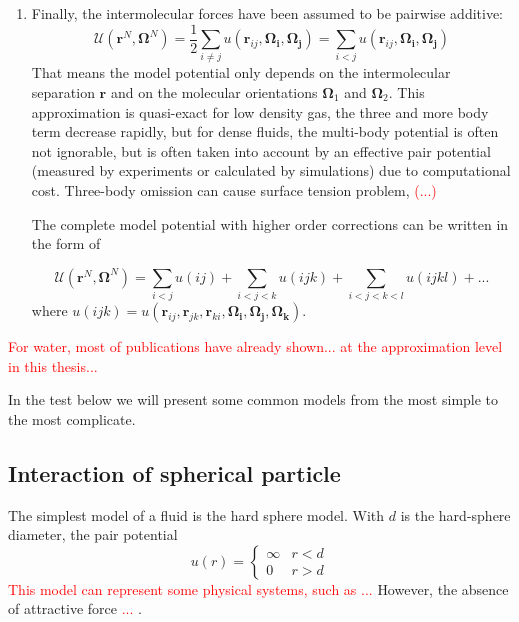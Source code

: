 \begin{enumerate}
\item Finally, the intermolecular forces have been assumed to be pairwise
additive:
\begin{equation}
\mathcal{U}(\mathbf{r}^{N},\mathbf{\Omega}^{N})=\frac{1}{2}\sum_{i\neq j}u(\mathbf{r}_{ij},\mathbf{\Omega_{i}},\mathbf{\Omega_{j}})=\sum_{i<j}u(\mathbf{r}_{ij},\mathbf{\Omega_{i}},\mathbf{\Omega_{j}})\label{eq:pair-potential}
\end{equation}
That means the model potential only depends on the intermolecular
separation $\mathbf{r}$ and on the molecular orientations $\mathbf{\Omega}_{1}$
and $\mathbf{\Omega}_{2}$. This approximation is quasi-exact for
low density gas, the three and more body term decrease rapidly, but
for dense fluids, the multi-body potential is often not ignorable,
but is often taken into account by an effective pair potential (measured
by experiments or calculated by simulations) due to computational
cost. Three-body omission can cause surface tension problem, \textcolor{red}{(...)}


The complete model potential with higher order corrections can be
written in the form of


\begin{equation}
\mathcal{U}(\mathbf{r}^{N},\mathbf{\Omega}^{N})=\sum_{i<j}u(ij)+\sum_{i<j<k}u(ijk)+\sum_{i<j<k<l}u(ijkl)+...
\end{equation}
where $u(ijk)=u(\mathbf{r}_{ij},\mathbf{r}_{jk},\mathbf{r}_{ki},\mathbf{\Omega_{i}},\mathbf{\Omega_{j}},\mathbf{\Omega_{k}})$.

\end{enumerate}
\textcolor{red}{For water, most of publications have already shown...
at the approximation level in this thesis...}

In the test below we will present some common models from the most
simple to the most complicate.


\subsection{Interaction of spherical particle}

The simplest model of a fluid is the hard sphere model. With $d$
is the hard-sphere diameter, the pair potential
\begin{equation}
u(r)=\begin{cases}
\infty & r<d\\
0 & r>d
\end{cases}
\end{equation}
\textcolor{red}{This model can represent some physical systems, such
as ... }However, the absence of attractive force \textcolor{red}{...}
.

